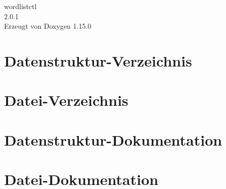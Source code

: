 \documentclass[twoside]{book}
\newcommand{\+}{\discretionary{\mbox{\scriptsize$\hookleftarrow$}}{}{}}
\newcommand{\clearemptydoublepage}{%
    \newpage{\pagestyle{empty}\cleardoublepage}%
  }
\begin{document}
  \raggedbottom
    \hypersetup{pageanchor=false,
                bookmarksnumbered=true,
                pdfencoding=unicode
               }
  \begin{titlepage}
  \vspace*{7cm}
  \begin{center}%
  {\Large wordlistctl}\\
  [1ex]\large 2.\+0.\+1 \\
  \vspace*{1cm}
  {\large Erzeugt von Doxygen 1.15.0}\\
  \end{center}
  \end{titlepage}
  \clearemptydoublepage
  \tableofcontents
  \clearemptydoublepage
  \hypersetup{pageanchor=true}

\chapter{Datenstruktur-\/\+Verzeichnis}

\chapter{Datei-\/\+Verzeichnis}

\chapter{Datenstruktur-\/\+Dokumentation}



\chapter{Datei-\/\+Dokumentation}




  \backmatter
  \newpage
  \clearemptydoublepage
  \printindex
\end{document}
